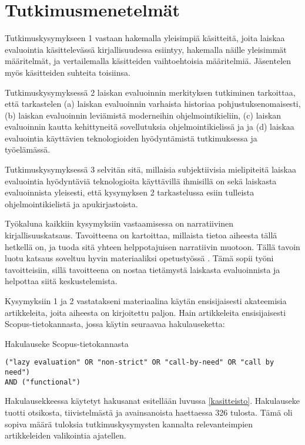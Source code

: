 \section{Tutkimusmenetelmät}\label{metodologia}

Tutkimuskysymykseen 1 vastaan hakemalla yleisimpiä käsitteitä, joita laiskaa evaluointia käsittelevässä kirjallisuudessa esiintyy, hakemalla näille yleisimmät määritelmät, ja vertailemalla käsitteiden vaihtoehtoisia määritelmiä. Jäsentelen myös käsitteiden suhteita toisiinsa.

Tutkimuskysymyksessä 2 laiskan evaluoinnin merkityksen tutkiminen tarkoittaa, että tarkastelen (a) laiskan evaluoinnin varhaista historiaa pohjustuksenomaisesti, (b) laiskan evaluoinnin leviämistä moderneihin ohjelmointikieliin, (c) laiskan evaluoinnin kautta kehittyneitä sovellutuksia ohjelmointikielissä ja ja (d) laiskaa evaluointia käyttävien teknologioiden hyödyntämistä tutkimuksessa ja työelämässä.

Tutkimuskysymyksessä 3 selvitän sitä, millaisia subjektiivisia mielipiteitä laiskaa evaluointia hyödyntäviä teknologioita käyttävillä ihmisillä on sekä laiskasta evaluoinnista yleisesti, että kysymyksen 2 tarkastelussa esiin tulleista ohjelmointikielistä ja apukirjastoista.

Työkaluna kaikkiin kysymyksiin vastaamisessa on narratiivinen kirjallisuuskatsaus. Tavoitteena on kartoittaa, millaista tietoa aiheesta tällä hetkellä on, ja tuoda sitä yhteen helppotajuisen narratiivin muotoon. Tällä tavoin luotu katsaus soveltuu hyvin materiaaliksi opetustyössä \citep[s. 312]{baumeister1997writing}. Tämä sopii työni tavoitteisiin, sillä tavoitteena on nostaa tietämystä laiskasta evaluoinnista ja helpottaa siitä keskustelemista.

Kysymyksiin 1 ja 2 vastatakseni materiaalina käytän ensisijaisesti akateemisia artikkeleita, joita aiheesta on kirjoitettu paljon. Hain artikkeleita ensisijaisesti Scopus-tietokannasta, jossa käytin seuraavaa hakulauseketta:

\begin{listing}[H]
  \caption{Hakulauseke Scopus-tietokannasta}
  \bigskip
  \begin{verbatim}
("lazy evaluation" OR "non-strict" OR "call-by-need" OR "call by need")
AND ("functional")
  \end{verbatim}
\end{listing}

Hakulausekkeessa käytetyt hakusanat esitellään luvussa \ref{kasitteisto}. Hakulauseke tuotti otsikosta, tiivistelmästä ja avainsanoista haettaessa 326 tulosta. Tämä oli sopiva määrä tuloksia tutkimuskysymysten kannalta relevanteimpien artikkeleiden valikointia ajatellen.

